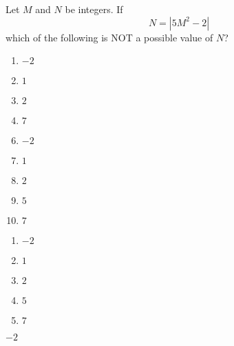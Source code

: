 









 Let $M$ and $N$ be integers.  If \[N = |5M^2-2|\]which of the following is NOT a possible value of $N$?



\ifsat
	\begin{enumerate}[label=\Alph*)]
		\item   $-2$ %
		\item  $1$
		\item  $2$
		\item  $7$
	\end{enumerate}
\else
\fi

\ifacteven
	\begin{enumerate}[label=\textbf{\Alph*.},itemsep=\fill,align=left]
		\setcounter{enumii}{5}
		\item   $-2$ %
		\item  $1$
		\item  $2$
		\addtocounter{enumii}{1}
		\item  $5$
		\item  $7$
	\end{enumerate}
\else
\fi

\ifactodd
	\begin{enumerate}[label=\textbf{\Alph*.},itemsep=\fill,align=left]
		\item   $-2$ %
		\item  $1$
		\item  $2$
		\item  $5$
		\item  $7$
	\end{enumerate}
\else
\fi

\ifgridin
   $-2$ %
		
\else
\fi

